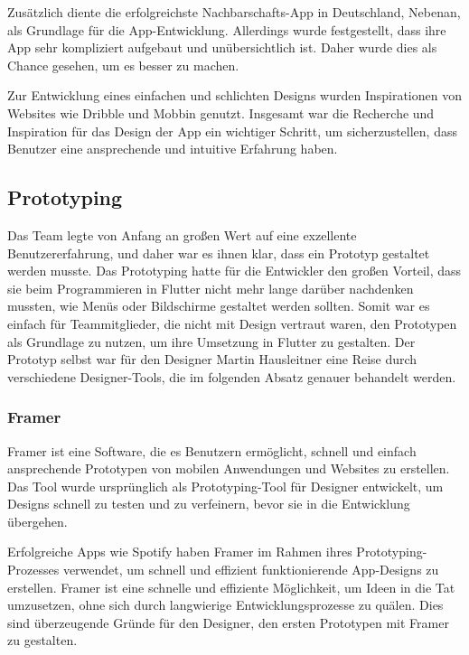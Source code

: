 Zusätzlich diente die erfolgreichste Nachbarschafts-App in Deutschland, Nebenan\cite{nebenan}, als Grundlage für die App-Entwicklung. Allerdings wurde festgestellt, dass ihre App sehr kompliziert aufgebaut und unübersichtlich ist. Daher wurde dies als Chance gesehen, um es besser zu machen.

Zur Entwicklung eines einfachen und schlichten Designs wurden Inspirationen von Websites wie Dribble\cite{dribble} und Mobbin\cite{mobbin} genutzt. Insgesamt war die Recherche und Inspiration für das Design der App ein wichtiger Schritt, um sicherzustellen, dass Benutzer eine ansprechende und intuitive Erfahrung haben.

\subsection{Prototyping}
Das Team legte von Anfang an großen Wert auf eine exzellente
Benutzererfahrung, und daher war es ihnen klar, dass ein
Prototyp gestaltet werden musste. Das Prototyping hatte für
die Entwickler den großen Vorteil, dass sie beim
Programmieren in Flutter nicht mehr lange darüber nachdenken
mussten, wie Menüs oder Bildschirme gestaltet werden
sollten. Somit war es einfach für Teammitglieder, die nicht
mit Design vertraut waren, den Prototypen als Grundlage zu
nutzen, um ihre Umsetzung in Flutter zu gestalten. Der
Prototyp selbst war für den Designer Martin Hausleitner eine
Reise durch verschiedene Designer-Tools, die im folgenden
Absatz genauer behandelt werden.


\subsubsection{Framer}

Framer ist eine Software, die es Benutzern ermöglicht, schnell und einfach ansprechende Prototypen von mobilen Anwendungen und Websites zu erstellen. Das Tool wurde ursprünglich als Prototyping-Tool für Designer entwickelt, um Designs schnell zu testen und zu verfeinern, bevor sie in die Entwicklung übergehen.

Erfolgreiche Apps wie Spotify haben Framer im Rahmen ihres
Prototyping-Prozesses verwendet, um schnell und effizient
funktionierende App-Designs zu erstellen. Framer ist eine
schnelle und effiziente Möglichkeit, um Ideen in die Tat
umzusetzen, ohne sich durch langwierige Entwicklungsprozesse
zu quälen. Dies sind überzeugende Gründe für den Designer, den ersten Prototypen mit Framer zu gestalten.

